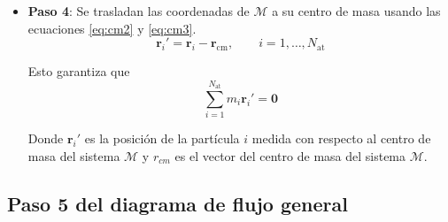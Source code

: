 \begin{itemize}
		
		\item \textbf{Paso 4}: Se trasladan las coordenadas de $\mathcal{M}$ a su centro de masa usando las ecuaciones \ref{eq:cm2} y \ref{eq:cm3}.
		\begin{equation}
			\mathbf{r}_i' = \mathbf{r}_i - \mathbf{r}_{\text{cm}}, \qquad
			i=1,\dots,N_{\text{at}}
			\label{eq:cm2}
		\end{equation}
		
		Esto garantiza que
		\begin{equation}
			\sum_{i=1}^{N_{\text{at}}} m_i \mathbf{r}_i' = \mathbf{0}
			\label{eq:cm3}
		\end{equation} 
		
		Donde $\mathbf{r}_i'$ es la posici\'{o}n de la part\'{i}cula $i$ medida 
		con respecto al centro de masa del sistema $\mathcal{M}$ y 
		$r_{cm}$ es el vector del centro de masa del sistema $\mathcal{M}$.
		
		
	\end{itemize}


	\subsection{Paso 5 del diagrama de flujo general}
	 \label{subsec:paso5}
	
